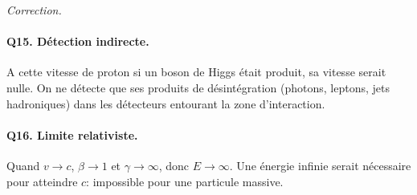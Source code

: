 \documentclass[11pt,a4paper]{article}
\newenvironment{correction}{
    \par\begingroup
    \color{blue!60!black}
    \smallskip\noindent\textit{Correction.}\quad
}{\par\medskip\endgroup}
\begin{document}
\begin{correction}
\paragraph{Q15. Détection indirecte.} A cette vitesse de proton si un boson de Higgs était produit, sa vitesse serait nulle. On ne détecte que ses produits de désintégration (photons, leptons, jets hadroniques) dans les détecteurs entourant la zone d'interaction.

\paragraph{Q16. Limite relativiste.} Quand $v\to c$, $\beta\to 1$ et $\gamma \to \infty$, donc $E \to \infty$. Une énergie infinie serait nécessaire pour atteindre $c$: impossible pour une particule massive.

\end{correction}

\end{document}
